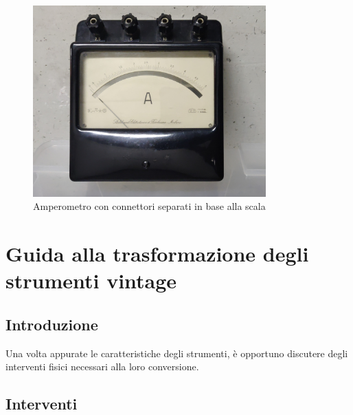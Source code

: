 \documentclass[12pt,a4paper]{report}
\begin{document}
\begin{figure}[h]
  \centering
  \includegraphics[width=0.8\textwidth]{connettorimultipli}
  \caption{Amperometro con connettori separati in base alla scala}
  \label{fig:connettorimultipli}
\end{figure}



\chapter{Guida alla trasformazione degli strumenti vintage}




\section{Introduzione}
Una volta appurate le caratteristiche degli strumenti, è opportuno discutere degli interventi fisici necessari alla loro conversione.


\section{Interventi}
\end{document}
